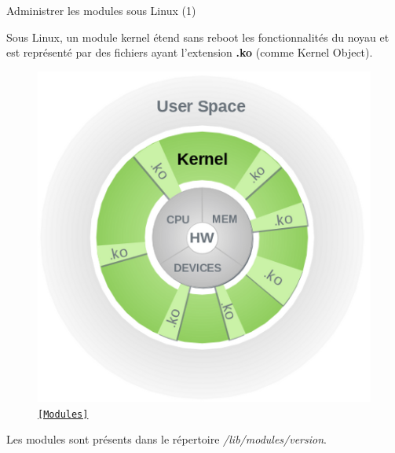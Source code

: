 \documentclass[12pt, t]{beamer}
\newcommand{\src}[2]{\vspace{-10pt}\caption{\href{#1}{\centering \tt \tiny [#2]}}}
\begin{document}
\begin{frame}{Administrer les modules sous Linux (1)}

    \vspace{10pt}
    Sous Linux, un module kernel étend sans reboot les fonctionnalités du noyau
    et est représenté par des fichiers ayant l'extension {\textbf{.ko}} (comme
    Kernel Object).

    \begin{figure}
        \centering
        \includegraphics[scale=0.5]{modules.png}
        \src{https://drivers.suse.com/doc/SolidDriver/Kernel_Modules.html}{Modules}
    \end{figure}

    {
        Les modules sont présents dans le répertoire
        {\textit{/lib/modules/version}}.
    }

\end{frame}

\end{document}
